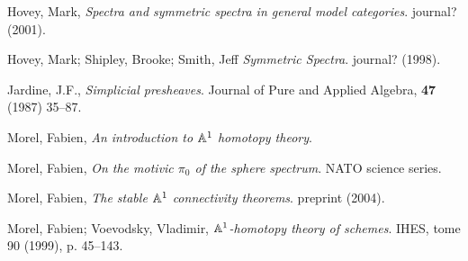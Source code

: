 \documentclass{amsart}%
\begin{document}
\begin{thebibliography}{OOOO}
     Hovey, Mark, {\it Spectra and symmetric
    spectra in general model categories}. journal? (2001).

     Hovey, Mark; Shipley, Brooke; Smith, Jeff
  {\it Symmetric Spectra}. journal? (1998).





     Jardine, J.F., {\it Simplicial
    presheaves}. Journal of Pure and Applied Algebra, {\bf 47} (1987)
  35--87.



     Morel, Fabien, {\it An introduction to $\mathbb{A}^1$
    homotopy theory}.

     Morel, Fabien, {\it On the motivic $\pi_0$
    of the sphere spectrum}. NATO science series.

     Morel, Fabien, {\it The stable $\mathbb{A}^1$
    connectivity theorems}. preprint (2004).

     Morel, Fabien; Voevodsky, Vladimir, {\it $\mathbb{A}^1$-homotopy theory of schemes}. IHES, tome 90 (1999), p. 45--143. 






\end{thebibliography}
\end{document}
